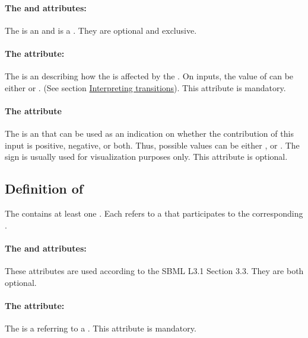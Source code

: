 \paragraph{The  and  attributes:}
The  is an  and  is a . They are optional and exclusive.

\paragraph{The  attribute:}
The  is an  describing how the  is affected by the . On inputs, the value of  can be either  or . (See section \hyperlink{inter_trans}{Interpreting transitions}). This attribute is mandatory.

\paragraph{The  attribute}
The  is an  that can be used as an indication on whether the contribution of this input is positive, negative, or both. Thus, possible values can be either ,  or . The sign is usually used for visualization purposes only. This attribute is optional.

\bigskip
\subsection*{Definition of } %
The  contains at least one .
Each  refers to a  that participates to the corresponding .

\paragraph{The  and  attributes:}
These attributes are used according to the SBML L3.1 Section 3.3. They are both optional. 

\paragraph{The  attribute:}
The  is a  referring to a . This attribute is mandatory.


